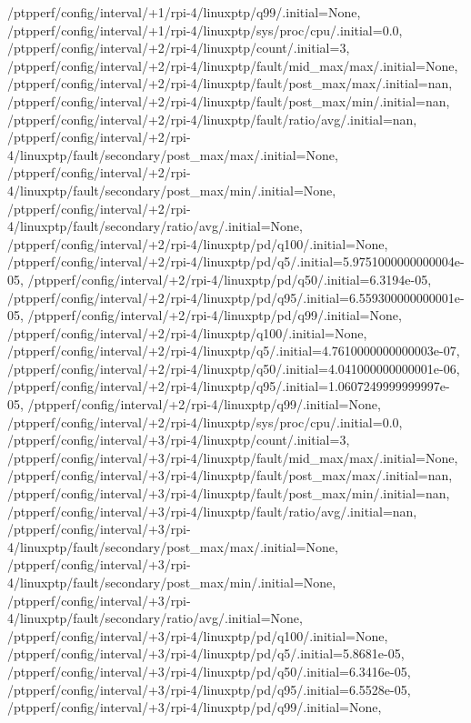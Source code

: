 {    /ptpperf/config/interval/+1/rpi-4/linuxptp/q99/.initial=None,
    /ptpperf/config/interval/+1/rpi-4/linuxptp/sys/proc/cpu/.initial=0.0,
    /ptpperf/config/interval/+2/rpi-4/linuxptp/count/.initial=3,
    /ptpperf/config/interval/+2/rpi-4/linuxptp/fault/mid_max/max/.initial=None,
    /ptpperf/config/interval/+2/rpi-4/linuxptp/fault/post_max/max/.initial=nan,
    /ptpperf/config/interval/+2/rpi-4/linuxptp/fault/post_max/min/.initial=nan,
    /ptpperf/config/interval/+2/rpi-4/linuxptp/fault/ratio/avg/.initial=nan,
    /ptpperf/config/interval/+2/rpi-4/linuxptp/fault/secondary/post_max/max/.initial=None,
    /ptpperf/config/interval/+2/rpi-4/linuxptp/fault/secondary/post_max/min/.initial=None,
    /ptpperf/config/interval/+2/rpi-4/linuxptp/fault/secondary/ratio/avg/.initial=None,
    /ptpperf/config/interval/+2/rpi-4/linuxptp/pd/q100/.initial=None,
    /ptpperf/config/interval/+2/rpi-4/linuxptp/pd/q5/.initial=5.9751000000000004e-05,
    /ptpperf/config/interval/+2/rpi-4/linuxptp/pd/q50/.initial=6.3194e-05,
    /ptpperf/config/interval/+2/rpi-4/linuxptp/pd/q95/.initial=6.559300000000001e-05,
    /ptpperf/config/interval/+2/rpi-4/linuxptp/pd/q99/.initial=None,
    /ptpperf/config/interval/+2/rpi-4/linuxptp/q100/.initial=None,
    /ptpperf/config/interval/+2/rpi-4/linuxptp/q5/.initial=4.7610000000000003e-07,
    /ptpperf/config/interval/+2/rpi-4/linuxptp/q50/.initial=4.041000000000001e-06,
    /ptpperf/config/interval/+2/rpi-4/linuxptp/q95/.initial=1.0607249999999997e-05,
    /ptpperf/config/interval/+2/rpi-4/linuxptp/q99/.initial=None,
    /ptpperf/config/interval/+2/rpi-4/linuxptp/sys/proc/cpu/.initial=0.0,
    /ptpperf/config/interval/+3/rpi-4/linuxptp/count/.initial=3,
    /ptpperf/config/interval/+3/rpi-4/linuxptp/fault/mid_max/max/.initial=None,
    /ptpperf/config/interval/+3/rpi-4/linuxptp/fault/post_max/max/.initial=nan,
    /ptpperf/config/interval/+3/rpi-4/linuxptp/fault/post_max/min/.initial=nan,
    /ptpperf/config/interval/+3/rpi-4/linuxptp/fault/ratio/avg/.initial=nan,
    /ptpperf/config/interval/+3/rpi-4/linuxptp/fault/secondary/post_max/max/.initial=None,
    /ptpperf/config/interval/+3/rpi-4/linuxptp/fault/secondary/post_max/min/.initial=None,
    /ptpperf/config/interval/+3/rpi-4/linuxptp/fault/secondary/ratio/avg/.initial=None,
    /ptpperf/config/interval/+3/rpi-4/linuxptp/pd/q100/.initial=None,
    /ptpperf/config/interval/+3/rpi-4/linuxptp/pd/q5/.initial=5.8681e-05,
    /ptpperf/config/interval/+3/rpi-4/linuxptp/pd/q50/.initial=6.3416e-05,
    /ptpperf/config/interval/+3/rpi-4/linuxptp/pd/q95/.initial=6.5528e-05,
    /ptpperf/config/interval/+3/rpi-4/linuxptp/pd/q99/.initial=None,
}
